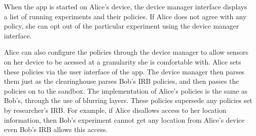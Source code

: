 When the \sysname app is started on Alice's device, the device 
manager interface displays a list of running experiments and their policies. If 
Alice does not agree with any policy, she can opt out of the particular 
experiment using the device manager interface. 

Alice can also configure the policies through the device manager to allow
sensors on her device to be acessed at a granularity she is comfortable with.
Alice sets these policies via the user interface of the \sysname app. 
The device manager then parses them just as the clearinghouse
parses Bob's IRB policies, and then passes the policies on to the sandbox.
The implementation of Alice's policies is the same as Bob's, through
the use of blurring layers.
These policies supersede any policies set by researcher's IRB. For 
example, if Alice disallows access to her location information, then 
Bob's experiment cannot get any location from Alice's device even
Bob's IRB allows this access. 


